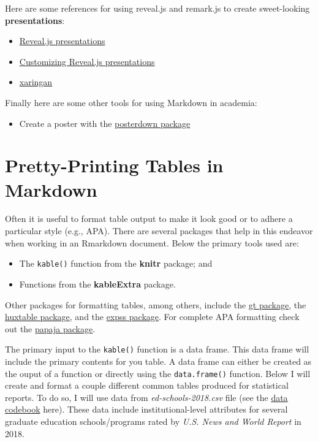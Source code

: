 \documentclass[]{book}
\providecommand{\tightlist}{%
  \setlength{\itemsep}{0pt}\setlength{\parskip}{0pt}}
\begin{document}
Here are some references for using reveal.js and remark.js to create sweet-looking \textbf{presentations}:

\begin{itemize}
\tightlist
\item
  \href{http://rmarkdown.rstudio.com/revealjs_presentation_format.html}{Reveal.js presentations}
\item
  \href{https://logfc.wordpress.com/2015/06/24/presentations-in-rmarkdown/}{Customizing Reveal.js presentations}
\item
  \href{https://github.com/yihui/xaringan}{xaringan}
\end{itemize}

Finally here are some other tools for using Markdown in academia:

\begin{itemize}
\tightlist
\item
  Create a poster with the \href{https://github.com/brentthorne/posterdown}{posterdown package}
\end{itemize}

\hypertarget{pretty-printing-tables-in-markdown}{%
\chapter*{Pretty-Printing Tables in Markdown}\label{pretty-printing-tables-in-markdown}}

Often it is useful to format table output to make it look good or to adhere a particular style (e.g., APA). There are several packages that help in this endeavor when working in an Rmarkdown document. Below the primary tools used are:

\begin{itemize}
\tightlist
\item
  The \texttt{kable()} function from the \textbf{knitr} package; and
\item
  Functions from the \textbf{kableExtra} package.
\end{itemize}

Other packages for formatting tables, among others, include the \href{https://gt.rstudio.com/}{gt package}, the \href{https://hughjonesd.github.io/huxtable/}{huxtable package}, and the \href{https://gdemin.github.io/expss/}{expss package}. For complete APA formatting check out the \href{https://crsh.github.io/papaja_man/}{papaja package}.

The primary input to the \texttt{kable()} function is a data frame. This data frame will include the primary contents for you table. A data frame can either be created as the ouput of a function or directly using the \texttt{data.frame()} function. Below I will create and format a couple different common tables produced for statistical reports. To do so, I will use data from \emph{ed-schools-2018.csv} file (see the \protect\hyperlink{ed-schools-2018}{data codebook} here). These data include institutional-level attributes for several graduate education schools/programs rated by \emph{U.S. News and World Report} in 2018.
\end{document}
